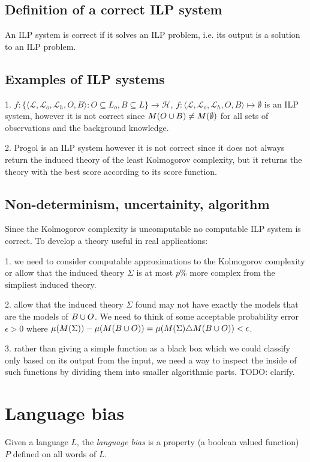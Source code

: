 \subsection{Definition of a correct ILP system}
An ILP system is correct if it solves an ILP problem, i.e. its output is a solution to an ILP problem.

\subsection{Examples of ILP systems}
1. $f:\{ \langle\mathcal{L}, \mathcal{L}_o, \mathcal{L}_h, O, B\rangle : O \subseteq L_o, B \subseteq L \} \to \mathcal{H}$, $f:\langle\mathcal{L}, \mathcal{L}_o, \mathcal{L}_h, O, B\rangle \mapsto \emptyset$ is an ILP system, however it is not correct since $M(O \cup B) \not= M(\emptyset)$ for all sets of observations and the background knowledge.

2. Progol is an ILP system however it is not correct since it does not always return the induced theory of the least Kolmogorov complexity, but it returns the theory with the best score according to its score function.

\subsection{Non-determinism, uncertainity, algorithm}

Since the Kolmogorov complexity is uncomputable no computable ILP system is correct. To develop a theory useful in real applications:

1. we need to consider computable approximations to the Kolmogorov complexity or allow that the induced theory $\Sigma$ is at most $p\%$ more complex from the simpliest induced theory.

2. allow that the induced theory $\Sigma$ found may not have exactly the models that are the models of $B \cup O$. We need to think of some acceptable probability error $\epsilon>0$ where $\mu(M(\Sigma))-\mu(M(B \cup O)) = \mu(M(\Sigma)  \triangle  M(B \cup O)) < \epsilon$.

3. rather than giving a simple function as a black box which we could classify only based on its output from the input, we need a way to inspect the inside of such functions by dividing them into smaller algorithmic parts.
TODO: clarify.

\section{Language bias}
\begin{defn}
Given a language $L$, the \emph{language bias} is a property (a boolean valued function) $P$ defined on all words of $L$.
\end{defn}


